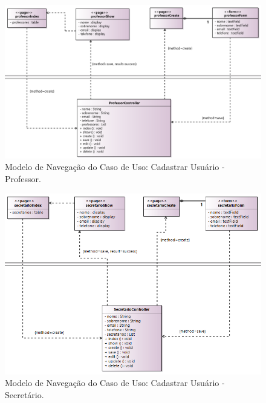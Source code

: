 \begin{figure}[!h]
	\centering
	\includegraphics[width=1\textwidth]{figuras/fig-projeto-cadastrarUsuarioProfessor.png}
	\caption{Modelo de Navegação do Caso de Uso: Cadastrar Usuário - Professor.}
	\label{fig-projeto-cadastrarUsuarioProfessor}
\end{figure}

\begin{figure}[!h]
	\centering
	\includegraphics[width=1\textwidth]{figuras/fig-projeto-cadastrarUsuarioSecretario.png}
	\caption{Modelo de Navegação do Caso de Uso: Cadastrar Usuário - Secretário.}
	\label{fig-projeto-cadastrarUsuarioSecretario}
\end{figure}

